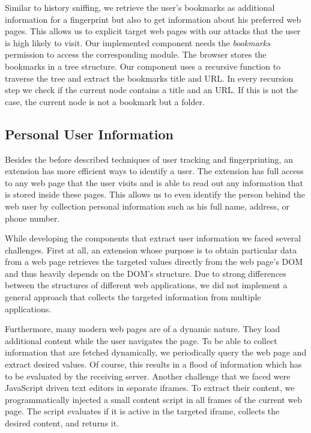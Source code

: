 	Similar to history sniffing, we retrieve the user's bookmarks as additional information for a fingerprint but also to get information about his preferred web pages. This allows us to explicit target web pages with our attacks that the user is high likely to visit. Our implemented component needs the \textit{bookmarks} permission to access the corresponding module. The browser stores the bookmarks in a tree structure. Our component uses a recursive function to traverse the tree and extract the bookmarks title and URL. In every recursion step we check if the current node contains a title and an URL. If this is not the case, the current node is not a bookmark but a folder.

\subsection{Personal User Information}
\label{sec:personalUserInformation}
	
	Besides the before described techniques of user tracking and fingerprinting, an extension has more efficient ways to identify a user. The extension has full access to any web page that the user visits and is able to read out any information that is stored inside these pages. This allows us to even identify the person behind the web user by collection personal information such as his full name, address, or phone number. 
	
	While developing the components that extract user information we faced several challenges. First at all, an extension whose purpose is to obtain particular data from a web page retrieves the targeted values directly from the web page's DOM and thus heavily depends on the DOM's structure. Due to strong differences between the structures of different web applications, we did not implement a general approach that collects the targeted information from multiple applications. 
	
	Furthermore, many modern web pages are of a dynamic nature. They load additional content while the user navigates the page. To be able to collect information that are fetched dynamically, we periodically query the web page and extract desired values. Of course, this results in a flood of information which has to be evaluated by the receiving server. Another challenge that we faced were JavaScript driven text editors in separate iframes. To extract their content, we programmatically injected a small content script in all frames of the current web page. The script evaluates if it is active in the targeted iframe, collects the desired content, and returns it. 
	
